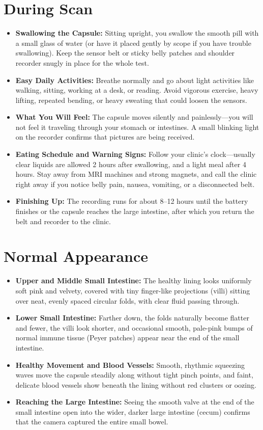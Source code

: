 \section{During Scan}
\begin{itemize}
    \item \textbf{Swallowing the Capsule:} Sitting upright, you swallow the smooth pill with a small glass of water (or have it placed gently by scope if you have trouble swallowing). Keep the sensor belt or sticky belly patches and shoulder recorder snugly in place for the whole test.
    \item \textbf{Easy Daily Activities:} Breathe normally and go about light activities like walking, sitting, working at a desk, or reading. Avoid vigorous exercise, heavy lifting, repeated bending, or heavy sweating that could loosen the sensors.
    \item \textbf{What You Will Feel:} The capsule moves silently and painlessly---you will not feel it traveling through your stomach or intestines. A small blinking light on the recorder confirms that pictures are being received.
    \item \textbf{Eating Schedule and Warning Signs:} Follow your clinic's clock---usually clear liquids are allowed 2 hours after swallowing, and a light meal after 4 hours. Stay away from MRI machines and strong magnets, and call the clinic right away if you notice belly pain, nausea, vomiting, or a disconnected belt.
    \item \textbf{Finishing Up:} The recording runs for about 8--12 hours until the battery finishes or the capsule reaches the large intestine, after which you return the belt and recorder to the clinic.
\end{itemize}

\section{Normal Appearance}
\begin{itemize}
    \item \textbf{Upper and Middle Small Intestine:} The healthy lining looks uniformly soft pink and velvety, covered with tiny finger-like projections (villi) sitting over neat, evenly spaced circular folds, with clear fluid passing through.
    \item \textbf{Lower Small Intestine:} Farther down, the folds naturally become flatter and fewer, the villi look shorter, and occasional smooth, pale-pink bumps of normal immune tissue (Peyer patches) appear near the end of the small intestine.
    \item \textbf{Healthy Movement and Blood Vessels:} Smooth, rhythmic squeezing waves move the capsule steadily along without tight pinch points, and faint, delicate blood vessels show beneath the lining without red clusters or oozing.
    \item \textbf{Reaching the Large Intestine:} Seeing the smooth valve at the end of the small intestine open into the wider, darker large intestine (cecum) confirms that the camera captured the entire small bowel.
\end{itemize}

